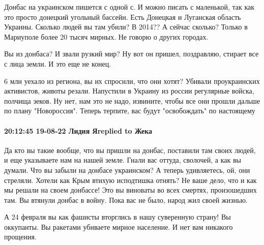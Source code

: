 Донбас на украинском пишется с одной с. И можно писать с маленькой, так как это
просто донецкий угольный бассейн. Есть Донецкая и Луганская область Украины.
Сколько людей вы там убили? В 2014?? А сейчас сколько? Только в Мариуполе более
20 тысяч мирных. Не говорю о других городах. 

Вы из донбаса? И звали рузкий мир? Ну вот он пришел, поздравляю, стирает все с
лица земли. И это еще не конец.

6 млн уехало из региона, вы их спросили, что они хотят? Убивали проукраинских
активистов, животы резали. Напустили в Украину из россии регулярные войска,
полчища зеков. Ну нет, нам это не надо, извините, чтобы все они прошли дальше
по плану "Новороссия". Теперь терпите, вас будут "освобождать" по настоящему

\paragraph{20:12:45 19-08-22 Лидия Яreplied to Жека}

Да кто вы такие вообще, что вы пришли на донбас, поставили там своих людей, и
еще указываете нам на нашей земле. Гнали вас оттуда, сволочей, а как вы думали.
Что вы забыли на донбасе украинском? А теперь удивляетесь, ой, они стреляли.
Хотели как Крым втихую исподтишка отнять? Не ваше дело, что и как мы решали на
своем донбассе! Это вы виноваты во всех смертях, произошедших там. Вы втянули
донбас в войну. Пока вас не было, народ жил своей жизнью.

А 24 февраля вы как фашисты вторглись в нашу суверенную страну! Вы оккупанты.
Вы ракетами убиваете мирное население. И нет вам никакого прощения.
